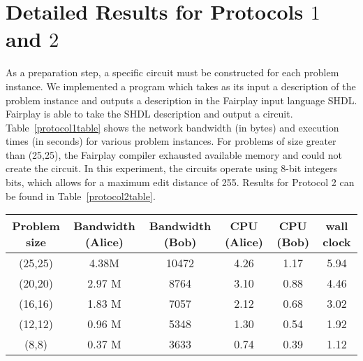\section{Detailed Results for Protocols $1$ and $2$}
\label{appendix:results} 



As a preparation step, a specific circuit must be constructed for each
problem instance.  We implemented a program which takes as its input a
description of the problem instance and outputs a description in the
Fairplay input language SHDL. Fairplay is able to take the SHDL
description and output a circuit. Table~\ref{protocol1table} shows the
network bandwidth (in bytes) and execution times (in seconds) for
various problem instances. For problems of size greater than (25,25),
the Fairplay compiler exhausted available memory and could not create
the circuit. In this experiment, the circuits operate using $8$-bit
integers bits, which allows for a maximum edit distance of 255. Results
for Protocol 2 can be found in Table~\ref{protocol2table}.

%
\begin{table*}
\begin{center}
\begin{tabular}{|c||c|c|c|c|c|} \hline 
Problem size & Bandwidth (Alice) & Bandwidth (Bob) & CPU (Alice) & CPU (Bob) & wall clock \\ \hline \hline 
(25,25)& 4.38M & 10472 & 4.26 & 1.17 & 5.94 \\ \hline 
(20,20)& 2.97 M & 8764 & 3.10 & 0.88 & 4.46 \\ \hline
(16,16) &1.83 M & 7057 & 2.12 & 0.68 & 3.02 \\ \hline
(12,12) & 0.96 M & 5348 & 1.30 & 0.54 & 1.92 \\ \hline 
(8,8) & 0.37 M & 3633 & 0.74 & 0.39 & 1.12 \tabularnewline
\hline
\end{tabular}
\end{center}


\caption{Network bandwidth (in bytes) and timing measurements (in seconds) for protocol 1. (M refers to Megabytes)}
\label{protocol1table}
\end{table*}

